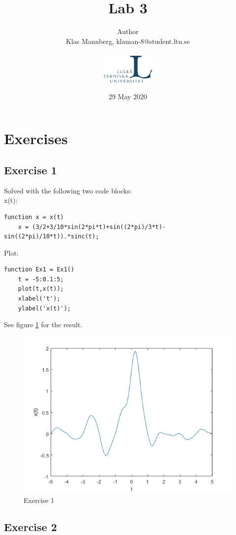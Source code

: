 \documentclass[a4paper]{article}
\title{Lab 3}
\author{
Author \\
{Klas Mannberg,   klaman-8@student.ltu.se
} \\ \\
\includegraphics[width=0.2\textwidth]{ltu_swe.jpg}}
\date{29 May 2020}
\begin{document}
\maketitle

\section{Exercises}
\subsection{Exercise 1}
Solved with the following two code blocks: \\
x(t): \\
\begin{lstlisting}
function x = x(t)
    x = (3/2+3/10*sin(2*pi*t)+sin((2*pi)/3*t)-sin((2*pi)/10*t)).*sinc(t);
\end{lstlisting}
Plot: \\
\begin{lstlisting}
function Ex1 = Ex1()
    t = -5:0.1:5;
    plot(t,x(t));
    xlabel('t');
    ylabel('x(t)');
\end{lstlisting}
See figure \ref{fig:1} for the result. \\
\begin{figure}
    \centering
    \includegraphics{1.png}
    \caption{Exercise 1}
    \label{fig:1}
\end{figure}

\subsection{Exercise 2}
\end{document}
